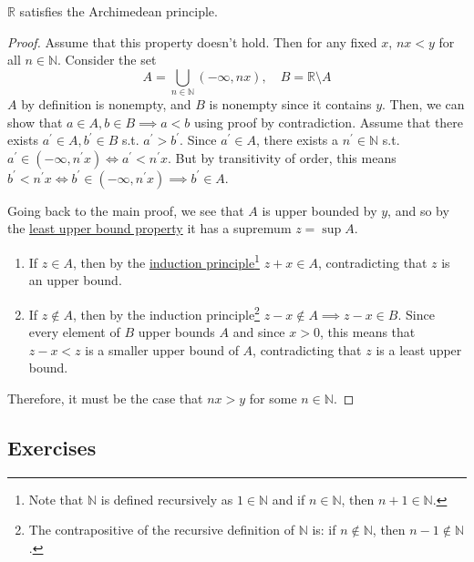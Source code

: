   \begin{theorem}
    \label{thm:reals-are-archimedean}
    $\mathbb{R}$ satisfies the Archimedean principle. 
  \end{theorem}
  \begin{proof}
    Assume that this property doesn't hold. Then for any fixed $x$, $nx < y$ for all $n \in \mathbb{N}$. Consider the set 
    \begin{equation}
      A = \bigcup_{n \in \mathbb{N}} (-\infty, nx), \quad B = \mathbb{R} \setminus A
    \end{equation}
    $A$ by definition is nonempty, and $B$ is nonempty since it contains $y$. Then, we can show that $a \in A, b \in B \implies a < b$ using proof by contradiction. Assume that there exists $a^\prime \in A, b^\prime \in B$ s.t. $a^\prime > b^\prime$. Since $a^\prime \in A$, there exists a $n^\prime \in \mathbb{N}$ s.t. $a^\prime \in (-\infty, n^\prime x) \iff a^\prime < n^\prime x$. But by transitivity of order, this means $b^\prime < n^\prime x \iff b^\prime \in (-\infty, n^\prime x) \implies b^\prime \in A$. 

    Going back to the main proof, we see that $A$ is upper bounded by $y$, and so by the \hyperref[def:least-upper-bound-property]{least upper bound property} it has a supremum $z = \sup{A}$. 
    \begin{enumerate}
      \item If $z \in A$, then by the \hyperref[st-thm:induction-principle]{induction principle}\footnote{Note that $\mathbb{N}$ is defined recursively as $1 \in \mathbb{N}$ and if $n \in \mathbb{N}$, then $n+1 \in \mathbb{N}$. } $z + x \in A$, contradicting that $z$ is an upper bound. 
      \item If $z \not\in A$, then by the induction principle\footnote{The contrapositive of the recursive definition of $\mathbb{N}$ is: if $n \not\in \mathbb{N}$, then $n-1 \not\in \mathbb{N}$.} $z-x \not\in A \implies z-x \in B$. Since every element of $B$ upper bounds $A$ and since $x > 0$, this means that $z-x < z$ is a smaller upper bound of $A$, contradicting that $z$ is a least upper bound. 
    \end{enumerate}
    Therefore, it must be the case that $nx > y$ for some $n \in \mathbb{N}$. 
  \end{proof}

\subsection{Exercises} 
